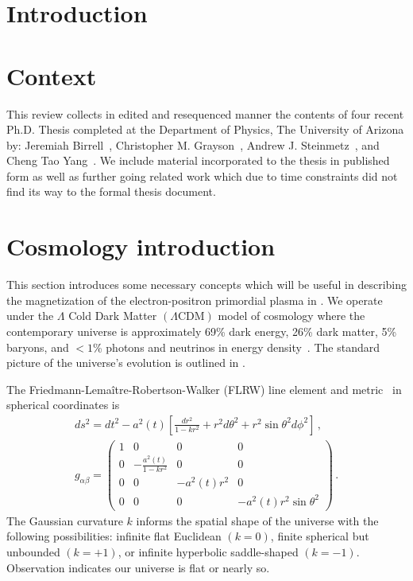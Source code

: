 \section{Introduction}
\label{sec:Intro}
\section*{Context}
\label{sec:context}
This review collects in edited and resequenced manner the contents of four recent Ph.D. Thesis completed at the Department of Physics, The University of Arizona by: Jeremiah Birrell~\cite{BirrellThesis:2014}, Christopher M. Grayson~\cite{GraysonThesis:2024}, Andrew J. Steinmetz~\cite{SteinmetzThesis:2023}, and Cheng Tao Yang~\cite{YangThesis:2023}. We include material incorporated to the thesis in published form as well as further going related work which due to time constraints did not find its way to the formal thesis document.

\setcounter{tocdepth}{2}
\tableofcontents

\section{Cosmology introduction}
\label{sec:flrw}
\noindent This section introduces some necessary concepts which will be useful in describing the magnetization of the electron-positron primordial plasma in . We operate under the $\Lambda$ Cold Dark Matter $(\Lambda\mathrm{CDM})$ model of cosmology where the contemporary universe is approximately 69\% dark energy, 26\% dark matter, 5\% baryons, and $<1$\% photons and neutrinos in energy density~\cite{Davis:2003ad,Planck:2018vyg}. The standard picture of the universe's evolution is outlined in .

The Friedmann-Lema{\^i}tre-Robertson-Walker (FLRW) line element and metric~\cite{weinberg1972gravitation} in spherical coordinates is
\begin{gather}
    \label{FLRW} ds^2=dt^2-a^2(t)\left[\frac{dr^2}{1-kr^{2}}+r^{2}d\theta^2+r^{2}\sin\theta^{2}d\phi^2\right]\,,\\
    g_{\alpha\beta}=
    \begin{pmatrix}
        1&0&0&0\\
        0&-\frac{a^{2}(t)}{1-kr^{2}}&0&0\\
        0&0&-a^{2}(t)r^{2}&0\\
        0&0&0&-a^{2}(t)r^{2}\sin\theta^{2}
    \end{pmatrix}\,.
\end{gather}
The Gaussian curvature $k$ informs the spatial shape of the universe with the following possibilities: infinite flat Euclidean $(k=0)$, finite spherical but unbounded $(k=+1)$, or infinite hyperbolic saddle-shaped $(k=-1)$. Observation indicates our universe is flat or nearly so.

